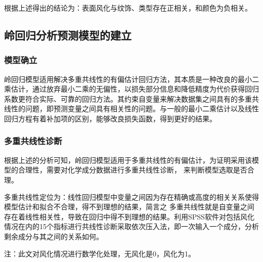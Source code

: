 \documentclass[UTF8]{ctexart}
\begin{document}
                根据上述得出的结论为：表面风化与纹饰、类型存在正相关，和颜色为负相关。

                \subsection{岭回归分析预测模型的建立}
                \subsubsection{模型确立}
                岭回归模型适用解决多重共线性的有偏估计回归方法，其本质是一种改良的最小二乘估计，通过放弃最小二乘的无偏性，以损失部分信息和降低精度为代价获得回归系数更符合实际、可靠的回归方法。其约束自变量来解决数据集之间具有的多重共线性的问题，即预测变量之间具有相关性的问题。与一般的最小二乘估计以及线性回归方程有着补加项的区别，能够改良损失函数，得到更好的结果。

                \subsubsection{多重共线性诊断}
                根据上述的分析可知，岭回归模型适用于多重共线性的有偏估计，为证明采用该模型的合理性，需要对化学成分数据进行多重共线性诊断，
                来判断模型选取是否合理。

                多重共线性定位为：线性回归模型中变量之间因为存在精确或高度的相关关系使得模型估计和拟合不合理，得不到理想的结果，简言之
                多重共线性就是自变量之间存在着线性相关性，导致在回归中得不到理想的结果。利用SPSS软件对包括风化情况在内的15个指标进行共线性诊断采取依次压入法，即一次输入一个成分，分析剩余成分与其之间的关系如何。

                注：此文对风化情况进行数学化处理，无风化是0，风化为1。
\end{document}
